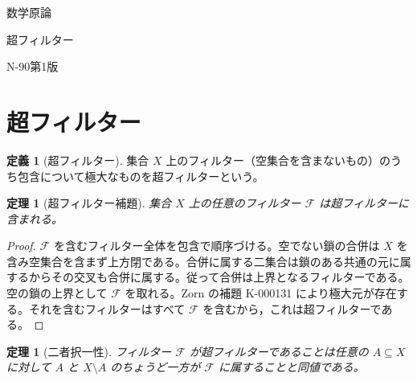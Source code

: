 \documentclass[a5paper,10pt,dvipdfmx]{jsarticle}
\theoremstyle{definition}
\newtheorem{defn}[ruledef]{定義}
\theoremstyle{plain}
\newtheorem{thm}[ruledef]{定理}
\begin{document}
\begin{center}
{\small 数学原論}\par\vspace{4mm}
{\LARGE 超フィルター}\par\vspace{2mm}
{\small N-90\quad 第1版}
\end{center}
\section{超フィルター}
\begin{defn}[超フィルター]\label{k269}
集合 $X$ 上のフィルター（空集合を含まないもの）のうち包含について極大なものを超フィルターという。
\end{defn}
\begin{thm}[超フィルター補題]\label{k270}
集合 $X$ 上の任意のフィルター $\mathcal F$ は超フィルターに含まれる。
\end{thm}
\begin{proof}
$\mathcal F$ を含むフィルター全体を包含で順序づける。空でない鎖の合併は $X$ を含み空集合を含まず上方閉である。合併に属する二集合は鎖のある共通の元に属するからその交叉も合併に属する。従って合併は上界となるフィルターである。空の鎖の上界として $\mathcal F$ を取れる。Zorn の補題 K-000131 により極大元が存在する。それを含むフィルターはすべて $\mathcal F$ を含むから，これは超フィルターである。
\end{proof}
\begin{thm}[二者択一性]\label{k271}
フィルター $\mathcal F$ が超フィルターであることは任意の $A\subseteq X$ に対して $A$ と $X\setminus A$ のちょうど一方が $\mathcal F$ に属することと同値である。
\end{thm}
\end{document}
